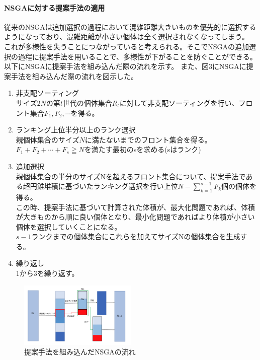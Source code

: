 \documentclass{rentai-chugoku}
\begin{document}
\paragraph{NSGAに対する提案手法の適用}
従来のNSGAは追加選択の過程において混雑距離大きいものを優先的に選択するようになっており、混雑距離が小さい個体は全く選択されなくなってしまう。
これが多様性を失うことにつながっていると考えられる。そこでNSGAの追加選択の過程に提案手法を用いることで、多様性が下がることを防ぐことができる。
以下にNSGAに提案手法を組み込んだ際の流れを示す。
また、図3にNSGAに提案手法を組み込んだ際の流れを図示した。
\begin{enumerate}
\item 非支配ソーティング\\
サイズ$2N$の第$ t $世代の個体集合$R_t$に対して非支配ソーティングを行い、フロント集合$F_1,F_2,\cdots $を得る。
\item ランキング上位半分以上のランク選択\\
親個体集合のサイズ$ N $に満たないまでのフロント集合を得る。
\\ $F_1+F_2+ \cdots+ F_s \geqq{N}$を満たす最初のsを求める(sはランク)
\item 追加選択\\
親個体集合の半分のサイズNを超えるフロント集合について、提案手法である超円錐堆積に基づいたランキング選択を行い上位$ N - \sum_{k=1}^{s-1}F_k $個の個体を得る。\\
この時、提案手法に基づいて計算された体積が、最大化問題であれば、体積が大きものから順に良い個体となり、最小化問題であればより体積が小さい個体を選択していくことになる。
\\ $s-1$ランクまでの個体集合にこれらを加えてサイズNの個体集合を生成する。
\item 繰り返し\\ 
$1$から$3$を繰り返す。
\end{enumerate}

\begin{figure}[h]
\begin{center}
\includegraphics[width=0.5\textwidth]{NSGA2.png}
\end{center}
\label{NSGA}
\caption{
提案手法を組み込んだNSGAの流れ
}
\end{figure}
\end{document}
